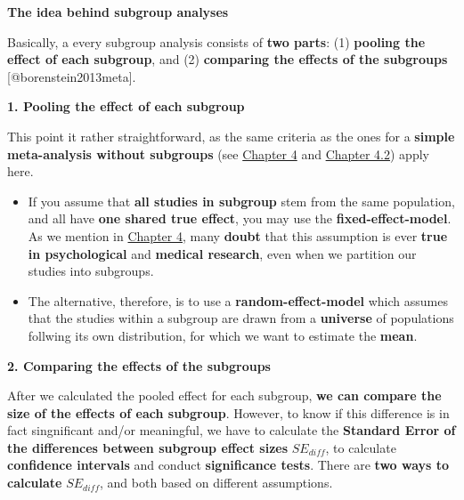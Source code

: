 \documentclass[]{book}
\providecommand{\tightlist}{%
  \setlength{\itemsep}{0pt}\setlength{\parskip}{0pt}}
\begin{document}
\begin{rmdinfo}
\textbf{The idea behind subgroup analyses}

Basically, a every subgroup analysis consists of \textbf{two parts}: (1)
\textbf{pooling the effect of each subgroup}, and (2) \textbf{comparing
the effects of the subgroups} {[}@borenstein2013meta{]}.

\textbf{1. Pooling the effect of each subgroup}

This point it rather straightforward, as the same criteria as the ones
for a \textbf{simple meta-analysis without subgroups} (see
\protect\hyperlink{pool}{Chapter 4} and
\protect\hyperlink{random}{Chapter 4.2}) apply here.

\begin{itemize}
\tightlist
\item
  If you assume that \textbf{all studies in subgroup} stem from the same
  population, and all have \textbf{one shared true effect}, you may use
  the \textbf{fixed-effect-model}. As we mention in
  \protect\hyperlink{pool}{Chapter 4}, many \textbf{doubt} that this
  assumption is ever \textbf{true in psychological} and \textbf{medical
  research}, even when we partition our studies into subgroups.
\item
  The alternative, therefore, is to use a \textbf{random-effect-model}
  which assumes that the studies within a subgroup are drawn from a
  \textbf{universe} of populations follwing its own distribution, for
  which we want to estimate the \textbf{mean}.
\end{itemize}

\textbf{2. Comparing the effects of the subgroups}

After we calculated the pooled effect for each subgroup, \textbf{we can
compare the size of the effects of each subgroup}. However, to know if
this difference is in fact singnificant and/or meaningful, we have to
calculate the \textbf{Standard Error of the differences between subgroup
effect sizes} \(SE_{diff}\), to calculate \textbf{confidence intervals}
and conduct \textbf{significance tests}. There are \textbf{two ways to
calculate} \(SE_{diff}\), and both based on different assumptions.


\end{rmdinfo}
\end{document}
